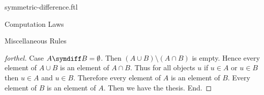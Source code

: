 \documentclass{naproche-library}
\begin{document}
\begin{smodule}[title=Symmetric Difference]{symmetric-difference.ftl}
\begin{sfragment}{Computation Laws}
\begin{sfragment}{Miscellaneous Rules}
\begin{proof}[forthel]
      Case $A \symdiff B = \emptyset$.
        Then $(A \cup B) \setminus (A \cap B)$ is empty.
        Hence every element of $A \cup B$ is an element of $A \cap B$.
        Thus for all objects $u$ if $u \in A$ or $u \in B$ then $u \in A$ and $u \in B$.
        Therefore every element of $A$ is an element of $B$.
        Every element of $B$ is an element of $A$.
        Then we have the thesis.
      End.
    \end{proof}
  \end{sfragment}
\end{sfragment}
\end{smodule}
\end{document}
